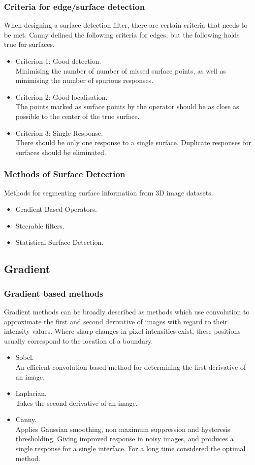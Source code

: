 \documentclass[9pt]{beamer}
\begin{document}
\begin{frame}
\frametitle{ Criteria for edge/surface detection }
When designing a surface detection filter, there are certain criteria that needs to be met. Canny defined the following criteria for edges, but the following holds true for surfaces.
\begin{itemize}
\item Criterion 1: Good detection.\\
Minimising the number of number of missed surface points, as well as minimising the number of spurious responses.
\item Criterion 2: Good localisation.\\
The points marked as surface points by the operator should be as close as possible to the center of the true surface.
\item Criterion 3: Single Response.\\
There should be only one response to a single surface. Duplicate responses for surfaces should be eliminated.
\end{itemize}
\end{frame}
\begin{frame}
\frametitle{ Methods of Surface Detection}
Methods for segmenting surface information from 3D image datasets.
\begin{itemize}
\item Gradient Based Operators.
\item Steerable filters.
\item Statistical Surface Detection.
\end{itemize}
\end{frame}
\subsection{Gradient}
\begin{frame}
\frametitle{Gradient based methods}
Gradient methods can be broadly described as methods which use convolution to approximate the first and second derivative of images with regard to their intensity values. Where sharp changes in pixel intensities exist, these positions usually correspond to the location of a boundary.
\begin{itemize}
\item Sobel.\\
An efficient convolution based method for determining the first derivative of an image.
\item Laplacian. \\
Takes the second derivative of an image.
\item Canny.\\
Applies Gaussian smoothing, non maximum suppression and hysteresis thresholding. Giving improved response in noisy images, and produces a single response for a single interface. For a long time considered the optimal method.
\end{itemize}
\end{frame}
\end{document}
